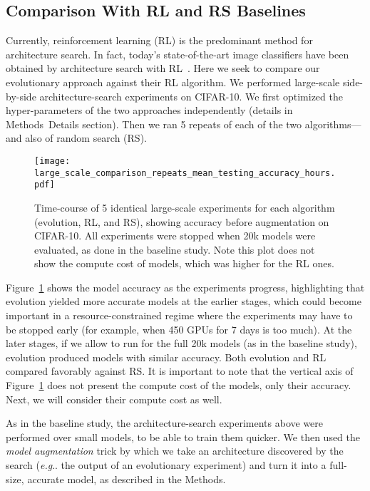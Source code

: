 \documentclass[letterpaper]{article} \usepackage{aaai19}  \usepackage{times}  \usepackage{helvet}  \usepackage{courier}  \usepackage{graphicx}  \frenchspacing
\makeatletter
\DeclareRobustCommand\onedot{\futurelet\@let@token\@onedot}
\def\@onedot{\ifx\@let@token.\else.\null\fi\xspace}
\def\eg{\emph{e.g}\onedot}
\makeatother
\begin{document}
\subsection{Comparison With RL and RS Baselines}


Currently, reinforcement learning (RL) is the predominant method for architecture search. In fact, today's state-of-the-art image classifiers have been obtained by architecture search with RL~\cite{zoph2017learning,liu2017progressive}. Here we seek to compare our evolutionary approach against their RL algorithm.  We performed large-scale side-by-side architecture-search experiments on CIFAR-10. We first optimized the hyper-parameters of the two approaches independently (details in Methods~Details section). Then we ran 5 repeats of each of the two algorithms---and also of random search (RS).

\begin{figure}[ht]
\centering
\texttt{[image: large\_scale\_comparison\_repeats\_mean\_testing\_accuracy\_hours.pdf]}
\caption{Time-course of 5 identical large-scale experiments for each algorithm (evolution, RL, and RS), showing accuracy before augmentation on CIFAR-10. All experiments were stopped when 20k models were evaluated, as done in the baseline study. Note this plot does not show the compute cost of models, which was higher for the RL ones.}
\label{evol_rl_rs_progress_fig}
\end{figure}

Figure~\ref{evol_rl_rs_progress_fig} shows the model accuracy as the experiments progress, highlighting that evolution yielded more accurate models at the earlier stages, which could become important in a resource-constrained regime where the experiments may have to be stopped early (for example, when 450 GPUs for 7 days is too much). At the later stages, if we allow to run for the full 20k models (as in the baseline study), evolution produced models with similar accuracy. Both evolution and RL compared favorably against RS. It is important to note that the vertical axis of Figure~\ref{evol_rl_rs_progress_fig} does not present the compute cost of the models, only their accuracy. Next, we will consider their compute cost as well.

As in the baseline study, the architecture-search experiments above were performed over small models, to be able to train them quicker. We then used the \textit{model augmentation} trick \cite{zoph2017learning} by which we take an architecture discovered by the search (\eg the output of an evolutionary experiment) and turn it into a full-size, accurate model, as described in the Methods.
\end{document}
